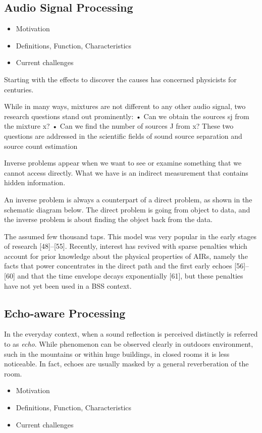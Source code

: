 \subsection{Audio Signal Processing}
\begin{itemize}
    \item Motivation
    \item Definitions, Function, Characteristics
    \item Current challenges
\end{itemize}
Starting with the effects to discover the causes has concerned physicists for centuries.

While in many ways, mixtures are not different to any other audio signal, two research questions stand out prominently: • Can we obtain the sources sj from the mixture x? • Can we find the number of sources J from x? These two questions are addressed in the scientific fields of sound
source separation and source count estimation


Inverse problems appear when we want to see or examine something that we cannot access directly. What we have is an indirect measurement that contains hidden information.

An inverse problem is always a counterpart of a direct problem, as shown in the schematic diagram below. The direct problem is going from object to data, and the inverse problem is about finding the object back from the data.

The assumed few thousand taps. This model was very popular in the early stages of research [48]–[55]. Recently, interest has revived with sparse penalties which account for prior knowledge about the physical properties of AIRs, namely the facts that power concentrates in the direct path and the first early echoes [56]– [60] and that the time envelope decays exponentially [61], but these penalties have not yet been used in a BSS context.

\subsection{Echo-aware Processing}
In the everyday context, when a sound reflection is perceived distinctly is referred to as \textit{echo}.
While phenomenon can be observed clearly in outdoors environment, such in the mountains or within huge buildings,
in closed rooms it is less noticeable. In fact, echoes are usually masked by a general reverberation of the room.

\begin{itemize}
    \item Motivation
    \item Definitions, Function, Characteristics
    \item Current challenges
\end{itemize}

